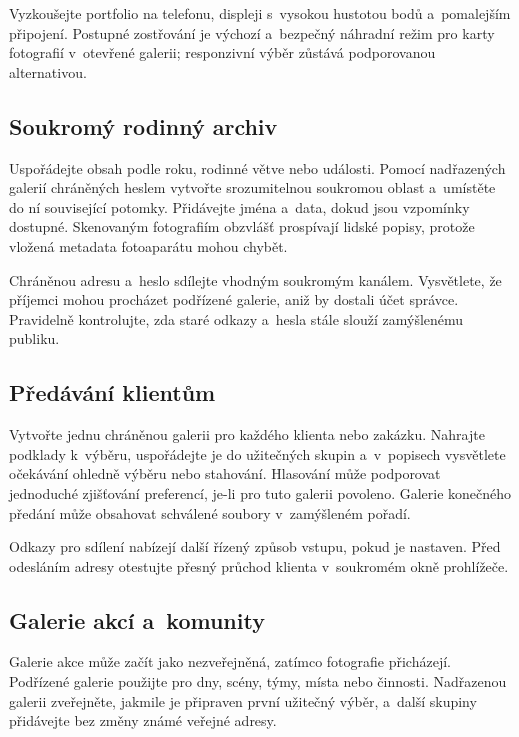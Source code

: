 \documentclass[11pt,a4paper]{article}
\begin{document}
Vyzkoušejte portfolio na telefonu, displeji s~vysokou hustotou bodů a~pomalejším
připojení. Postupné zostřování je výchozí a~bezpečný náhradní režim pro karty
fotografií v~otevřené galerii; responzivní výběr zůstává podporovanou
alternativou.

\subsection{Soukromý rodinný archiv}

Uspořádejte obsah podle roku, rodinné větve nebo události. Pomocí nadřazených
galerií chráněných heslem vytvořte srozumitelnou soukromou oblast a~umístěte do
ní související potomky. Přidávejte jména a~data, dokud jsou vzpomínky dostupné.
Skenovaným fotografiím obzvlášť prospívají lidské popisy, protože vložená
metadata fotoaparátu mohou chybět.

Chráněnou adresu a~heslo sdílejte vhodným soukromým kanálem. Vysvětlete, že
příjemci mohou procházet podřízené galerie, aniž by dostali účet správce.
Pravidelně kontrolujte, zda staré odkazy a~hesla stále slouží zamýšlenému
publiku.

\subsection{Předávání klientům}

Vytvořte jednu chráněnou galerii pro každého klienta nebo zakázku. Nahrajte
podklady k~výběru, uspořádejte je do užitečných skupin a~v~popisech vysvětlete
očekávání ohledně výběru nebo stahování. Hlasování může podporovat jednoduché
zjišťování preferencí, je-li pro tuto galerii povoleno. Galerie konečného
předání může obsahovat schválené soubory v~zamýšleném pořadí.

Odkazy pro sdílení nabízejí další řízený způsob vstupu, pokud je nastaven. Před
odesláním adresy otestujte přesný průchod klienta v~soukromém okně prohlížeče.

\subsection{Galerie akcí a~komunity}

Galerie akce může začít jako nezveřejněná, zatímco fotografie přicházejí.
Podřízené galerie použijte pro dny, scény, týmy, místa nebo činnosti. Nadřazenou
galerii zveřejněte, jakmile je připraven první užitečný výběr, a~další skupiny
přidávejte bez změny známé veřejné adresy.
\end{document}

